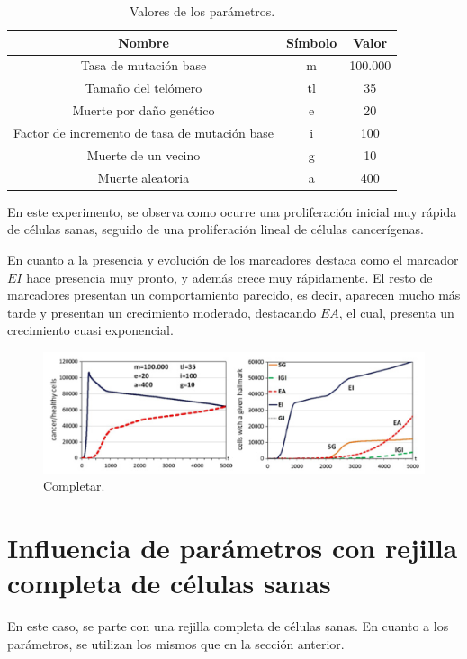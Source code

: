 \begin{table}[h!]
  \centering
  \caption{Valores de los parámetros.}
  \label{tab:table1}
  \begin{tabular}{ccc}
    \toprule
    Nombre & Símbolo & Valor\\
    \midrule
    Tasa de mutación base & m & 100.000\\
    Tamaño del telómero & tl & 35\\
    Muerte por daño genético & e & 20\\
    Factor de incremento de tasa de mutación base & i & 100\\
    Muerte de un vecino & g & 10\\
    Muerte aleatoria & a & 400\\
    \bottomrule
  \end{tabular}
\end{table}

En este experimento, se observa como ocurre una proliferación inicial muy rápida
de células sanas, seguido de una proliferación lineal de células cancerígenas.

En cuanto a la presencia y evolución de los marcadores destaca como el marcador $EI$ hace
presencia muy pronto, y además crece muy rápidamente. El resto de marcadores presentan un
comportamiento parecido, es decir, aparecen mucho más tarde y presentan un crecimiento moderado,
destacando $EA$, el cual, presenta un crecimiento cuasi exponencial.

\begin{figure}[h]
\centering
\includegraphics[scale=0.8]{figures/experiments/exp4}
\caption{Completar.}
\end{figure}

\section{Influencia de parámetros con rejilla completa de células sanas}

En este caso, se parte con una rejilla completa de células sanas. En cuanto a los parámetros,
se utilizan los mismos que en la sección anterior.

